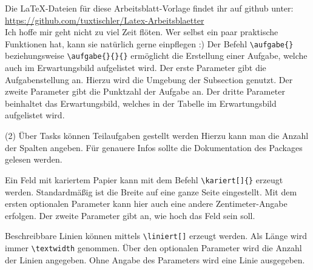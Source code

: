 \documentclass[a4paper, 12pt]{article}
\begin{document}
\TITEL

Die \LaTeX -Dateien für diese Arbeitsblatt-Vorlage findet ihr auf github unter:\\
\url{https://github.com/tuxtischler/Latex-Arbeitsblaetter}\\
Ich hoffe mir geht nicht zu viel Zeit flöten. Wer selbst ein paar praktische Funktionen hat, kann sie natürlich gerne einpflegen :)
Der Befehl \texttt{\textbackslash aufgabe\{\}} beziehungsweise \texttt{\textbackslash aufgabe\{\}\{\}\{\}} ermöglicht die Erstellung einer Aufgabe, welche auch im Erwartungsbild aufgelistet wird. Der erste Parameter gibt die Aufgabenstellung an. Hierzu wird die Umgebung der Subsection genutzt. Der zweite Parameter gibt die Punktzahl der Aufgabe an. Der dritte Parameter beinhaltet das Erwartungsbild, welches in der Tabelle im Erwartungsbild aufgelistet wird.

\begin{tasks}(2)
	\task Über Tasks können Teilaufgaben gestellt werden
	\task Hierzu kann man die Anzahl der Spalten angeben. Für genauere Infos sollte die Dokumentation des Packages gelesen werden.	
\end{tasks}

Ein Feld mit kariertem Papier kann mit dem Befehl \texttt{\textbackslash kariert[]\{\}} erzeugt werden. Standardmäßig ist die Breite auf eine ganze Seite eingestellt. Mit dem ersten optionalen Parameter kann hier auch eine andere Zentimeter-Angabe erfolgen. Der zweite Parameter gibt an, wie hoch das Feld sein soll.



Beschreibbare Linien können mittels \texttt{\textbackslash liniert[]} erzeugt werden. Als Länge wird immer \texttt{\textbackslash textwidth} genommen. Über den optionalen Parameter wird die Anzahl der Linien angegeben. Ohne Angabe des Parameters wird eine Linie ausgegeben.

\liniert[3]

\end{document}
